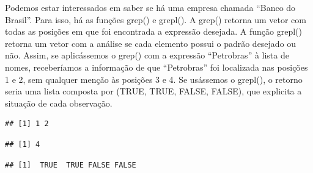 \documentclass[
]{book}
\newenvironment{Shaded}{\begin{snugshade}}{\end{snugshade}}
\newcommand{\FunctionTok}[1]{\textcolor[rgb]{0.00,0.00,0.00}{#1}}
\newcommand{\NormalTok}[1]{#1}
\newcommand{\SpecialCharTok}[1]{\textcolor[rgb]{0.00,0.00,0.00}{#1}}
\newcommand{\StringTok}[1]{\textcolor[rgb]{0.31,0.60,0.02}{#1}}
\begin{document}
Podemos estar interessados em saber se há uma empresa chamada ``Banco do Brasil''. Para isso, há as funções grep() e grepl(). A grep() retorna um vetor com todas as posições em que foi encontrada a expressão desejada. A função grepl() retorna um vetor com a análise se cada elemento possui o padrão desejado ou não. Assim, se aplicássemos o grep() com a expressão ``Petrobras'' à lista de nomes, receberíamos a informação de que ``Petrobras'' foi localizada nas posições 1 e 2, sem qualquer menção às posições 3 e 4. Se usássemos o grepl(), o retorno seria uma lista composta por (TRUE, TRUE, FALSE, FALSE), que explicita a situação de cada observação.

\begin{Shaded}
\end{Shaded}

\begin{verbatim}
## [1] 1 2
\end{verbatim}

\begin{Shaded}
\end{Shaded}

\begin{verbatim}
## [1] 4
\end{verbatim}

\begin{Shaded}
\end{Shaded}

\begin{verbatim}
## [1]  TRUE  TRUE FALSE FALSE
\end{verbatim}

\begin{Shaded}
\end{Shaded}
\end{document}
